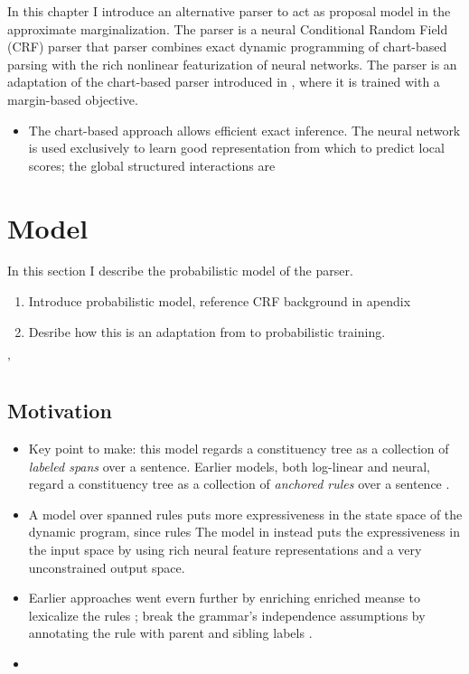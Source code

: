 % 

In this chapter I introduce an alternative parser to act as proposal model in the approximate marginalization. The parser is a neural Conditional Random Field (CRF) parser that parser combines exact dynamic programming of chart-based parsing with the rich nonlinear featurization of neural networks.  The parser is an adaptation of the chart-based parser introduced in \citet{Stern+2017:Minimal}, where it is trained with a margin-based objective.

\begin{itemize}
  \item The chart-based approach allows efficient exact inference. The neural network is used exclusively to learn good representation from which to predict local scores; the global structured interactions are
\end{itemize}

\section{Model}
In this section I describe the probabilistic model of the parser.
\begin{enumerate}
  \item Introduce probabilistic model, reference CRF background in apendix
  \item Desribe how this is an adaptation from \citet{Stern+2017:Minimal} to probabilistic training.
\end{enumerate}'

\subsection{Motivation}
\begin{itemize}
  \item Key point to make: this model regards a constituency tree as a collection of \textit{labeled spans} over a sentence. Earlier models, both log-linear and neural, regard a constituency tree as a collection of \textit{anchored rules} over a sentence \citep{Finkel+2008,Klein+2015}.
  \item A model over spanned rules puts more expressiveness in the state space of the dynamic program, since rules The model in \cite{Stern+2017:Minimal} instead puts the expressiveness in the input space by using rich neural feature representations and a very unconstrained output space.
  \item Earlier approaches went evern further by enriching enriched meanse to lexicalize the rules \cite{Collins2003}; break the grammar's independence assumptions by annotating the rule with parent and sibling labels \citep{Klein+2003}.
  \item
\end{itemize}

